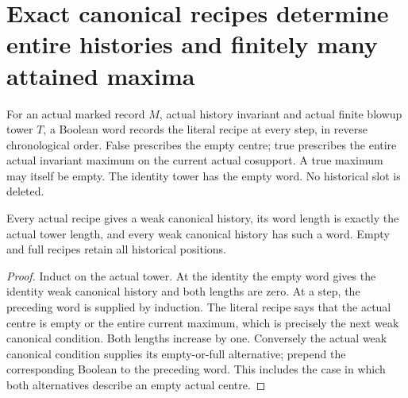 \section{Exact canonical recipes determine entire histories and finitely many attained maxima}

\begin{definition}
\label{hir:canonical-word-history-recipe}
\leanok
For an actual marked record $M$, actual history invariant and actual
finite blowup tower $T$, a Boolean word records the literal recipe at
every step, in reverse chronological order. False prescribes the empty
centre; true prescribes the entire actual invariant maximum on the
current actual cosupport. A true maximum may itself be empty. The
identity tower has the empty word. No historical slot is deleted.
\end{definition}

\begin{theorem}
\label{hir:canonical-word-history-properties}
\leanok
Every actual recipe gives a weak canonical history, its word length
is exactly the actual tower length, and every weak canonical history
has such a word. Empty and full recipes retain all historical positions.
\end{theorem}
\begin{proof}
Induct on the actual tower. At the identity the empty word gives the
identity weak canonical history and both lengths are zero. At a step,
the preceding word is supplied by induction. The literal recipe says
that the actual centre is empty or the entire current maximum, which
is precisely the next weak canonical condition. Both lengths increase
by one. Conversely the actual weak canonical condition supplies its
empty-or-full alternative; prepend the corresponding Boolean to the
preceding word. This includes the case in which both alternatives
describe an empty actual centre.
\end{proof}

